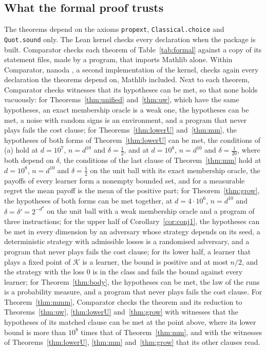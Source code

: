 \documentclass[11pt]{amsart}
\theoremstyle{definition}
\numberwithin{equation}{section}
\newcommand{\cK}{\mathcal{K}}
\begin{document}
\subsection{What the formal proof trusts}\label{sec:formal-trust}
The theorems depend on the axioms \texttt{propext}, \texttt{Classical.choice} and \texttt{Quot.sound} only.
The Lean kernel checks every declaration when the package is built. Comparator \cite{Comparator} checks each theorem of Table~\ref{tab:formal} against a copy of its statement files, made by a program, that imports Mathlib alone. Within Comparator, nanoda \cite{nanoda}, a second implementation of the kernel, checks again every declaration the theorems depend on, Mathlib included. Next to each theorem, Comparator checks witnesses that its hypotheses can be met, so that none holds vacuously: for Theorems~\ref{thm:unified} and~\ref{thm:uw}, which have the same hypotheses, an exact membership oracle is a weak one, the hypotheses can be met, a noise with random signs is an environment, and a program that never plays fails the cost clause; for Theorems~\ref{thm:lowerU} and~\ref{thm:mm}, the hypotheses of both forms of Theorem~\ref{thm:lowerU} can be met, the conditions of (a) hold at $d=10^7$, $n=d^{10}$ and $\delta=\frac12$, and at $d=10^8$, $n=d^{10}$ and $\delta=\frac1{20}$, where both depend on $\delta$, the conditions of the last clause of Theorem~\ref{thm:mm} hold at $d=10^8$, $n=d^{10}$ and $\delta=\frac12$ on the unit ball with its exact membership oracle, the payoffs of every learner form a nonempty bounded set, and for a measurable regret the mean payoff is the mean of the positive part; for Theorem~\ref{thm:grow}, the hypotheses of both forms can be met together, at $d=4\cdot10^6$, $n=d^{10}$ and $\delta=\delta'=2^{-d^4}$ on the unit ball with a weak membership oracle and a program of three instructions; for the upper half of Corollary~\ref{cor:conj1}, the hypotheses can be met in every dimension by an adversary whose strategy depends on its seed, a deterministic strategy with admissible losses is a randomised adversary, and a program that never plays fails the cost clause; for its lower half, a learner that plays a fixed point of $\cK$ is a learner, the bound is positive and at most $n/2$, and the strategy with the loss $0$ is in the class and fails the bound against every learner; for Theorem~\ref{thm:body}, the hypotheses can be met, the law of the runs is a probability measure, and a program that never plays fails the cost clause. For Theorem~\ref{thm:mmm}, Comparator checks the theorem and its reduction to Theorems~\ref{thm:uw}, \ref{thm:lowerU} and~\ref{thm:grow} with witnesses that the hypotheses of its matched clause can be met at the point above, where its lower bound is more than $10^8$ times that of Theorem~\ref{thm:mm}, and with the witnesses of Theorems~\ref{thm:lowerU}, \ref{thm:mm} and~\ref{thm:grow} that its other clauses read.
\end{document}
